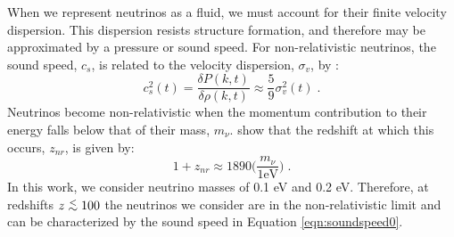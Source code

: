 \documentclass{aastex}
\def\ltsima{$\; \buildrel < \over \sim \;$}
\def\lsim{\lower.5ex\hbox{\ltsima}}
\begin{document}
When we represent neutrinos as a fluid,
we must account for their finite velocity dispersion.  This dispersion
resists structure formation, and therefore may be
approximated by a pressure or sound speed.  
%
%
%
For non-relativistic neutrinos, the sound speed, $c_s$, is related to the
velocity dispersion, $\sigma_v$, by \citep{shoji10}:
\begin{equation}\label{eqn:soundspeed0}
  c_s^2(t) = \frac{ \delta P(k,t) }{ \delta \rho(k, t) }
  \approx \frac{5}{9} \sigma_v^2(t)\;.
\end{equation}
Neutrinos become non-relativistic when the momentum contribution to
their energy falls below that of their mass, $m_\nu$.
\cite{shoji10} show that the redshift
at which this occurs, $z_{nr}$, is given by:
\begin{equation}
  1 + z_{nr} \approx 1890 \bigg(\frac{m_\nu}{1 \text{eV}} \bigg) \;.
\end{equation}
In this work, we consider neutrino masses of 0.1 eV and 0.2 eV.
Therefore, at redshifts $z\lsim 100$ the neutrinos we consider are in
the non-relativistic limit and can be characterized by the sound speed 
in Equation \eqref{eqn:soundspeed0}.
\end{document}

